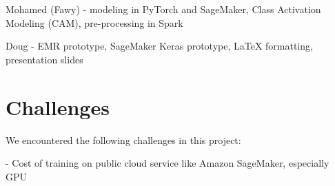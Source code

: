 \documentclass{amia}
\begin{document}
Mohamed (Fawy) - modeling in PyTorch and SageMaker, Class Activation Modeling (CAM), pre-processing in Spark

Doug - EMR prototype, SageMaker Keras prototype, LaTeX formatting, presentation slides

\section*{Challenges}

We encountered the following challenges in this project:

- Cost of training on public cloud service like Amazon SageMaker, especially GPU



\makeatletter

\let\oldsection\section
\renewcommand\section{\clearpage\oldsection}


\renewcommand{\@biblabel}[1]{\hfill #1.}
\makeatother
\end{document}
